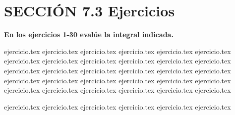 
\section*{SECCIÓN 7.3 \quad Ejercicios}

\noindent\textbf{En los ejercicios 1-30 evalúe la integral indicada.}
\begin{enumerate}
    {ejercicio.tex}
{ejercicio.tex}
{ejercicio.tex}
{ejercicio.tex}
{ejercicio.tex}
{ejercicio.tex}
{ejercicio.tex}
{ejercicio.tex}
{ejercicio.tex}
{ejercicio.tex}
{ejercicio.tex}
{ejercicio.tex}
{ejercicio.tex}
{ejercicio.tex}
{ejercicio.tex}
{ejercicio.tex}
{ejercicio.tex}
{ejercicio.tex}
{ejercicio.tex}
{ejercicio.tex}
{ejercicio.tex}
{ejercicio.tex}
{ejercicio.tex}
{ejercicio.tex}
{ejercicio.tex}
{ejercicio.tex}
{ejercicio.tex}
{ejercicio.tex}
{ejercicio.tex}
{ejercicio.tex}
\end{enumerate}

\vspace{0.5cm}
\begin{enumerate}
    \setcounter{enumi}{30}
    {ejercicio.tex}
{ejercicio.tex}
{ejercicio.tex}
{ejercicio.tex}
{ejercicio.tex}
{ejercicio.tex}
\end{enumerate}
